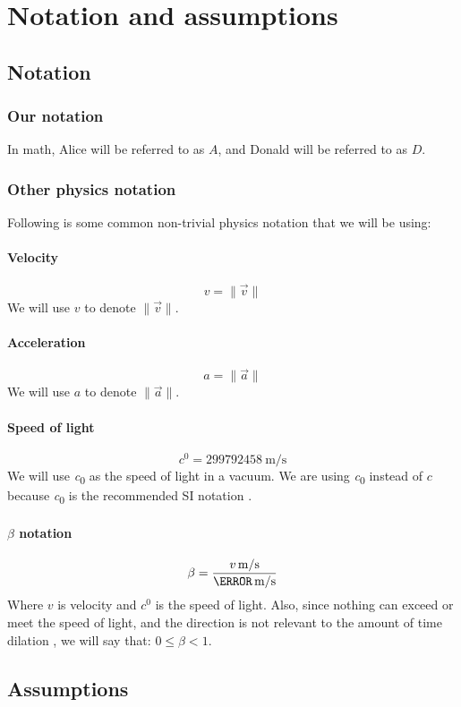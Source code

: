 	\section{Notation and assumptions}
		\subsection{Notation}\label{subsec:notation}
			\subsubsection{Our notation}
				In math, Alice will be referred to as $A$, and Donald will be referred to as $D$.
			\subsubsection{Other physics notation}
				Following is some common non-trivial physics notation that we will be using:
				\paragraph{Velocity}
					\[v = \|\vec{v}\|\]
					We will use $v$ to denote $\|\vec{v}\|$.
				\paragraph{Acceleration}
					\[a = \|\vec{a}\|\]
					We will use $a$ to denote $\|\vec{a}\|$.
				\paragraph{Speed of light}
					\[\si{\clight} = \SI{299792458}{\metre/\second}\]
					We will use \si{\clight} as the speed of light in a vacuum. We are using \si{\clight} instead of $c$ because \si{\clight} is the recommended SI notation \autocite{siunits}.
				\paragraph{$\beta$ notation}
					\[\beta = \frac{\varSI{v}{\metre/\second}}{\varSI{\clight}{\metre/\second}}\]
					Where $v$ is velocity and $\si{\clight}$ is the speed of light. Also, since nothing can exceed or meet the speed of light, and the direction is not relevant to the amount of time dilation \autocite{textbook,einstein1916}, we will say that: $0 \leq \beta < 1$.
		\subsection{Assumptions}\label{subsec:twinAssumptions}
